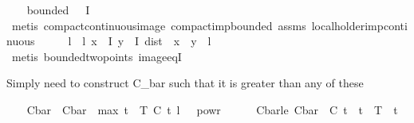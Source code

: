\begin{isabellebody}
\ \ \isamarkupfalse%
\ {\isachardoublequoteopen}bounded\ {\isacharparenleft}{\kern0pt}{\isasymphi}\ {\isacharbackquote}{\kern0pt}\ I{\isacharparenright}{\kern0pt}{\isachardoublequoteclose}\isanewline
\ \ \ \ \isamarkupfalse%
\ {\isacharparenleft}{\kern0pt}metis\ compact{\isacharunderscore}{\kern0pt}continuous{\isacharunderscore}{\kern0pt}image\ compact{\isacharunderscore}{\kern0pt}imp{\isacharunderscore}{\kern0pt}bounded\ assms\ local{\isacharunderscore}{\kern0pt}holder{\isacharunderscore}{\kern0pt}imp{\isacharunderscore}{\kern0pt}continuous{\isacharparenright}{\kern0pt}\isanewline
\ \ \isamarkupfalse%
\ \isamarkupfalse%
\ l\ \ l{\isacharcolon}{\kern0pt}\ {\isachardoublequoteopen}{\isasymforall}x\ {\isasymin}\ I{\isachardot}{\kern0pt}\ {\isasymforall}y\ {\isasymin}\ I{\isachardot}{\kern0pt}\ dist\ {\isacharparenleft}{\kern0pt}{\isasymphi}\ x{\isacharparenright}{\kern0pt}\ {\isacharparenleft}{\kern0pt}{\isasymphi}\ y{\isacharparenright}{\kern0pt}\ {\isasymle}\ l{\isachardoublequoteclose}\isanewline
\ \ \ \ \isamarkupfalse%
\ {\isacharparenleft}{\kern0pt}metis\ bounded{\isacharunderscore}{\kern0pt}two{\isacharunderscore}{\kern0pt}points\ image{\isacharunderscore}{\kern0pt}eqI{\isacharparenright}{\kern0pt}%
\begin{isamarkuptext}%
Simply need to construct C_bar such that it is greater than any of these%
\end{isamarkuptext}\isamarkuptrue%
\ \ \isamarkupfalse%
\ C{\isacharunderscore}{\kern0pt}bar\ \ {\isachardoublequoteopen}C{\isacharunderscore}{\kern0pt}bar\ {\isasymequiv}\ max\ {\isacharparenleft}{\kern0pt}{\isacharparenleft}{\kern0pt}{\isasymSum}t\ {\isasymin}\ T{\isachardot}{\kern0pt}\ C\ t{\isacharparenright}{\kern0pt}{\isacharparenright}{\kern0pt}\ {\isacharparenleft}{\kern0pt}l\ {\isacharasterisk}{\kern0pt}\ {\isasymrho}\ powr\ {\isacharparenleft}{\kern0pt}{\isacharminus}{\kern0pt}\ {\isasymgamma}{\isacharparenright}{\kern0pt}{\isacharparenright}{\kern0pt}{\isachardoublequoteclose}\isanewline
\ \ \isamarkupfalse%
\ C{\isacharunderscore}{\kern0pt}bar{\isacharunderscore}{\kern0pt}le{\isacharcolon}{\kern0pt}\ {\isachardoublequoteopen}C{\isacharunderscore}{\kern0pt}bar\ {\isasymge}\ C\ t{\isachardoublequoteclose}\ \ {\isachardoublequoteopen}t\ {\isasymin}\ T{\isachardoublequoteclose}\ \ t\isanewline
\ \ \isamarkupfalse%
\ {\isacharminus}{\kern0pt}\isanewline
\ \ \ \ \isamarkupfalse%

\end{isabellebody}
